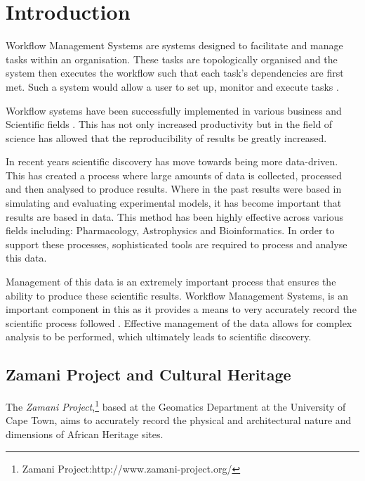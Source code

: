 
\chapter{Introduction}
    Workflow Management Systems are systems designed to facilitate and manage
    tasks within an organisation. These tasks are topologically organised and
    the system then executes the workflow
    such that each task's dependencies are first met. Such a system would allow a user to
    set up, monitor and execute tasks \cite{slot2005workflow}.

    Workflow systems have been successfully implemented in various
    business and Scientific fields \cite{Brahe:2007:SWW:1316624.1316661}.
    This has not only increased productivity but in the field of
    science has allowed that the reproducibility of results be greatly
    increased\cite{4721191}.

    In recent years scientific discovery has move towards being more data-driven\cite{gray2007escience}.
    This has created a process where large amounts of data is collected, processed
    and then analysed to produce results. Where in the past results were based in simulating
    and evaluating experimental models, it has become important that results are based in
    data. This method has been highly effective across various fields including: Pharmacology\cite{harpaz2012novel},
    Astrophysics\cite{thomas2011synapps} and Bioinformatics\cite{greene2010integrative}.
    In order to support these processes, sophisticated tools are required to process
    and analyse this data\cite{shneiderman2002inventing}.

    Management of this data is an extremely important process that ensures the
    ability to produce these scientific results\cite{gray2005scientific}. Workflow
    Management Systems, is an important component in this as it provides a means
    to very accurately record the scientific process followed  \cite{davidson2007provenance}.
    Effective management of the data allows for complex analysis to be performed,
    which ultimately leads to scientific discovery\cite{ludascher2009scientific}.




\section{Zamani Project and Cultural Heritage}
    The \emph{Zamani Project},\footnote{Zamani Project:http://www.zamani-project.org/}
    based at the Geomatics Department at the University of Cape Town,
    aims to accurately record the physical and architectural nature
    and dimensions of African Heritage sites.

